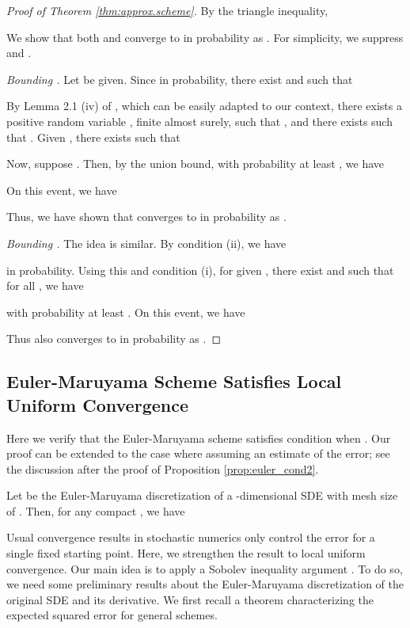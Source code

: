 \documentclass[twoside]{article}
\begin{document}
\begin{proof} [Proof of Theorem \ref{thm:approx.scheme}]
By the triangle inequality,

We show that both  and  converge to  in probability as .
For simplicity, we suppress  and .

{\it Bounding .} 
Let  be given. 
Since  in probability, there exist  and  such that

By Lemma 2.1 (iv) of \citet{ocone1989generalized}, which can be easily adapted to our context, there exists a positive random variable , finite almost surely, such that , and there exists  such that . Given , there exists  such that

Now, suppose . Then, by the union bound, with probability at least , we have
	
On this event, we have

Thus, we have shown that  converges to  in probability as .

\medskip

{\it Bounding .} The idea is similar. By condition (ii), we have

in probability. 
Using this and condition (i), for given , there exist  and  such that for all , we have

with probability at least . On this event, we have

Thus  also converges to  in probability as .
\end{proof}
 \subsection{Euler-Maruyama Scheme Satisfies Local Uniform Convergence}\label{app:euler_cond2}

Here we verify that the Euler-Maruyama scheme satisfies condition  when . 
Our proof can be extended to the case where  assuming an  estimate of the error; see the discussion after the proof of Proposition \ref{prop:euler_cond2}.

\begin{prop}\label{prop:euler_cond2}
Let  be the Euler-Maruyama discretization of a -dimensional SDE with mesh size  of . Then, for any compact , we have
\end{prop}

Usual convergence results in stochastic numerics only control the error for a single fixed starting point. Here, we strengthen the result to local uniform convergence. Our main idea is to apply a Sobolev inequality argument \cite[Part II]{ocone1989generalized}. To do so, we need some preliminary results about the Euler-Maruyama discretization of the original SDE and its derivative.
We first recall a theorem characterizing the expected squared error for general schemes.
\end{document}
